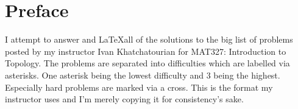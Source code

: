 \chapter{Preface}

I attempt to answer and \LaTeX all of the solutions to the big list of problems posted by my
instructor Ivan Khatchatourian for MAT327: Introduction to Topology. The problems are 
separated into difficulties which are labelled via asterisks. One asterisk being the lowest
difficulty and 3 being the highest. Especially hard problems are marked via a cross. This
is the format my instructor uses and I'm merely copying it for consistency's sake.